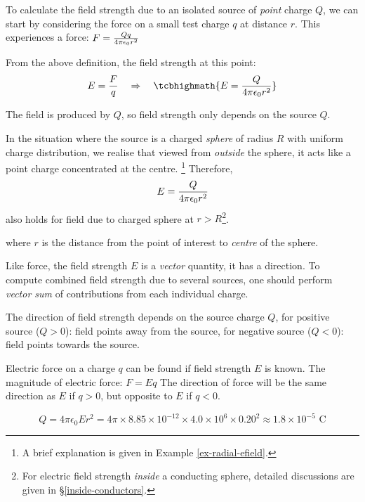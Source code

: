 To calculate the field strength due to an isolated source of \emph{point} charge $Q$, we can start by considering the force on a small test charge $q$ at distance $r$. This experiences a force: $F = \frac{Qq}{4\pi\epsilon_0 r^2}$

From the above definition, the field strength at this point: $$ E = \frac{F}{q} \RA \tcbhighmath{E=\frac{Q}{\ec r^2}}$$

The field is produced by $Q$, so field strength only depends on the source $Q$. 

In the situation where the source is a charged \emph{sphere} of radius $R$ with uniform charge distribution, we realise that viewed from \emph{outside} the sphere, it acts like a point charge concentrated at the centre. 
\footnote{A brief explanation is given in Example \ref{ex-radial-efield}.} Therefore, $$E=\frac{Q}{4\pi\epsilon_0 r^2}$$ also holds for field due to charged sphere at $r>R$\footnote{For electric field strength \emph{inside} a conducting sphere, detailed discussions are given in \S\ref{inside-conductors}.}.

where $r$ is the distance from the point of interest to \emph{centre} of the sphere.

Like force, the field strength $E$ is a \emph{vector} quantity, it has a direction. To compute combined field strength due to several sources, one should perform \emph{vector sum} of contributions from each individual charge. 

The direction of field strength depends on the source charge $Q$, for positive source ($Q>0$): field points away from the source, for negative source ($Q<0$): field points towards the source.

Electric force on a charge $q$ can be found if field strength $E$ is known. The magnitude of electric force: $F=Eq$ 
The direction of force will be the same direction as $E$ if $q>0$, but opposite to $E$ if $q<0$.


	
\begin{soln} 
\begin{equation*}
	Q=4\pi\epsilon_0 Er^2 = 4\pi \times 8.85\times 10^{-12} \times 4.0 \times 10^6 \times 0.20^2 \approx 1.8 \times 10^{-5} \text{ C} 
\end{equation*}
\end{soln}



